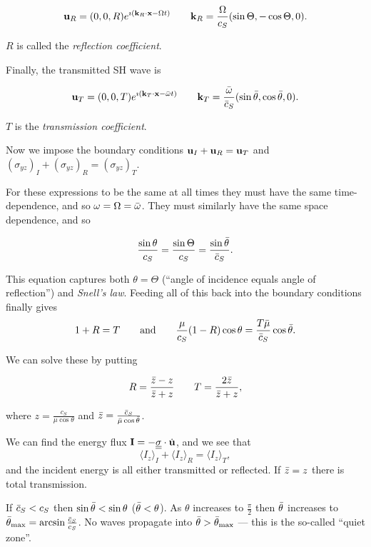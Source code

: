 \documentclass{notes}
\newcommand{\te}[1]{\underline{\underline{#1}}}
\newcommand{\vk}{\vect{k}}
\begin{document}
\begin{equation}\label{eq:SHref}
\vu_R = (0,0,R) e^{\imath\left(\vk_R \cdot \vx - \Omega t\right)} \qquad
\vk_R = \frac{\Omega}{c_S} (\sin \Theta,-\cos \Theta,0).
\end{equation}

$R$ is called the \emph{reflection coefficient}.

Finally, the transmitted SH wave is

\begin{equation}\label{eq:SHtrans}
\vu_T = (0,0,T) e^{\imath\left(\vk_T \cdot \vx - \Bar\omega t\right)} \qquad
\vk_T = \frac{\Bar \omega}{\Bar{c}_S} (\sin \Bar \theta, \cos \Bar \theta,0).
\end{equation}

$T$ is the \emph{transmission coefficient}.

Now we impose the boundary conditions $\mathbf{u}_I + \mathbf{u}_R = \mathbf{u}_T$
and $\left(\sigma_{yz}\right)_I + \left(\sigma_{yz}\right)_R
= \left(\sigma_{yz}\right)_T$.

For these expressions to be the same at all times they must have the
same time-dependence, and so $\omega = \Omega = \Bar{\omega}$.  They must
similarly have the same space dependence, and so

\begin{equation}\label{eq:snell}
\frac{\sin \theta}{c_S} = \frac{\sin \Theta}{c_S}
 = \frac{\sin \Bar{\theta}}{\Bar{c}_S}.
\end{equation}

This equation captures both $\theta = \Theta$ (``angle of incidence equals
angle of reflection'') and \emph{Snell's law}.  Feeding all of this
back into the boundary conditions finally gives
\[
1 + R = T \qquad \text{and} \qquad \frac{\mu}{c_S} (1-R) \cos \theta
= \frac{T \Bar{\mu}}{\Bar{c}_S} \cos \Bar{\theta}.
\]

We can solve these by putting

\[
R = \frac{\Bar{z} - z}{\Bar{z} + z} \qquad T = \frac{2 \Bar{z}}{\Bar{z}+z},
\]

where $z = \tfrac{c_S}{\mu \cos \theta}$ and $\Bar{z} = \frac{\Bar{c}_S}{
\Bar{\mu}\cos \Bar{\theta}}$.

We can find the energy flux $\vect{I} = - \te{\sigma} \cdot \Dot{\vu}$,
and we see that
\[
\langle I_z \rangle_I + \langle I_z \rangle_R = \langle I_z \rangle_T,
\]
and the incident energy is all either transmitted or reflected.  If
$\Bar{z} = z$ there is total transmission.

If $\Bar{c}_S < c_S$ then $\sin \Bar{\theta} < \sin \theta$ ($\Bar \theta
< \theta$).  As $\theta$ increases to $\tfrac{\pi}{2}$ then
$\Bar{\theta}$ increases to $\Bar{\theta}_{\text{max}} =
\arcsin \tfrac{\Bar{c}_S}{c_S}$.  No waves propagate into
$\Bar{\theta} > \Bar{\theta}_{\text{max}}$ --- this is the so-called
``quiet zone''.
\end{document}
